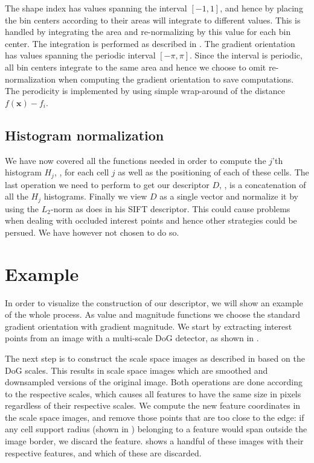 \documentclass[thesis.tex]{subfiles}
\def\x{\mathbf{x}}
\begin{document}
The shape index has values spanning the interval $[-1,1]$, and hence by placing the bin centers according to  their areas will integrate to different values. This is handled by integrating the area and re-normalizing by this value for each bin center. The integration is performed as described in . The gradient orientation has values spanning the periodic interval $[-\pi,\pi]$. Since the interval is periodic, all bin centers integrate to the same area and hence we choose to omit re-normalization when computing the gradient orientation to save computations. The perodicity is implemented by using simple wrap-around of the distance $f(\x) - f_i$.
%
\subsection{Histogram normalization}
We have now covered all the functions needed in order to compute the $j$'th histogram $H_j$, , for each cell $j$ as well as the positioning of each of these cells. The last operation we need to perform to get our descriptor $D$, , is a concatenation of all the $H_j$ histograms. Finally we view $D$ as a single vector and normalize it by using the $L_2$-norm as \citet{lowe2004distinctive} does in his SIFT descriptor. This could cause problems when dealing with occluded interest points and hence other strategies could be persued. We have however not chosen to do so.
%
\section{Example}
%
In order to visualize the construction of our descriptor, we will show an example of the whole process. As value and magnitude functions we choose the standard gradient orientation with gradient magnitude. We start by extracting interest points from an image with a multi-scale DoG detector, as shown in .

The next step is to construct the scale space images as described in  based on the DoG scales. This results in scale space images which are smoothed and downsampled versions of the original image. Both operations are done according to the respective scales, which causes all features to have the same size in pixels regardless of their respective scales. We compute the new feature coordinates in the scale space images, and remove those points that are too close to the edge: if any cell support radius (shown in ) belonging to a feature would span outside the image border, we discard the feature.  shows a handful of these images with their respective features, and which of these are discarded.
\end{document}
